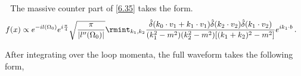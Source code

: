 \textbullet $\,\,$ The massive counter part of \eqref{6.35} takes the form.
\begin{align}
    \begin{split}
        f(x)&\propto e^{-il(\Omega_0)}e^{i\frac{\pi}{4}}\sqrt{\frac{\pi}{|l''(\Omega_0)|}}\rmint_{k_1,k_2}\frac{\hat\delta(k_0\cdot v_1+k_1\cdot v_1)\hat\delta(k_2\cdot v_2)\hat\delta(k_1\cdot v_2)}{(k_1^2-m^2) (k_2^2-m^2) [(k_1+k_2)^2-m^2]}e^{ik_1\cdot b}\,.
    \end{split}
\end{align}


After integrating over the loop momenta, the full waveform takes the following form,

